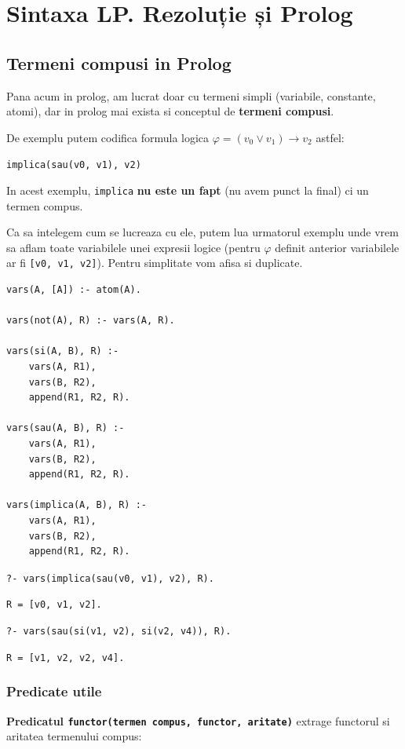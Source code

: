 \chapter{Sintaxa LP. Rezoluție și Prolog}

\section{Termeni compusi in Prolog}

Pana acum in prolog, am lucrat doar cu termeni simpli (variabile, constante, atomi), dar in prolog mai
exista si conceptul de \textbf{termeni compusi}.

De exemplu putem codifica formula logica $\varphi = (v_0 \lor v_1) \rightarrow v_2$ astfel:

\texttt{implica(sau(v0, v1), v2)}

In acest exemplu, \texttt{implica} \textbf{nu este un fapt} (nu avem punct la final) ci un termen compus.

\vspace{\baselineskip}

Ca sa intelegem cum se lucreaza cu ele, putem lua urmatorul exemplu unde vrem sa aflam
toate variabilele unei expresii logice (pentru $\varphi$ definit anterior variabilele ar fi \texttt{[v0, v1, v2]}).
Pentru simplitate vom afisa si duplicate.

\begin{lstlisting}
vars(A, [A]) :- atom(A).

vars(not(A), R) :- vars(A, R).

vars(si(A, B), R) :-
    vars(A, R1),
    vars(B, R2),
    append(R1, R2, R).

vars(sau(A, B), R) :-
    vars(A, R1),
    vars(B, R2),
    append(R1, R2, R).

vars(implica(A, B), R) :-
    vars(A, R1),
    vars(B, R2),
    append(R1, R2, R).
\end{lstlisting}

\texttt{?- vars(implica(sau(v0, v1), v2), R).}

\texttt{R = [v0, v1, v2].}

\texttt{?- vars(sau(si(v1, v2), si(v2, v4)), R).}

\texttt{R = [v1, v2, v2, v4].}


\subsection*{Predicate utile}

\textbf{Predicatul \texttt{functor(termen compus, functor, aritate)}} extrage functorul si aritatea
termenului compus:

